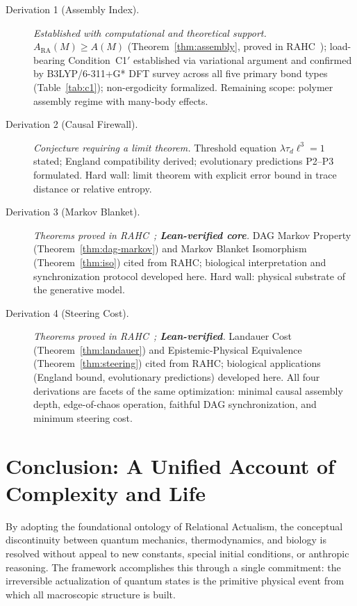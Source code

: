\documentclass[11pt,a4paper]{article}
\theoremstyle{plain}
\theoremstyle{definition}
\theoremstyle{remark}
\newcommand{\ARA}{A_{\mathrm{RA}}}
\begin{document}
\begin{description}
  \item[Derivation 1 (Assembly Index).] \textit{Established with computational
  and theoretical support.} $\ARA(M) \geq A(M)$ (Theorem~\ref{thm:assembly},
  proved in RAHC~\citep{Sandeman2026RAHC}); load-bearing Condition~C1$'$
  established via variational argument and confirmed by B3LYP/6-311+G* DFT survey
  across all five primary bond types (Table~\ref{tab:c1}); non-ergodicity
  formalized. Remaining scope: polymer assembly regime with many-body effects.

  \item[Derivation 2 (Causal Firewall).] \textit{Conjecture requiring a limit
  theorem.} Threshold equation $\lambda\tau_{d}\ell^{3} = 1$ stated; England
  compatibility derived; evolutionary predictions P2--P3 formulated. Hard wall:
  limit theorem with explicit error bound in trace distance or relative entropy.

  \item[Derivation 3 (Markov Blanket).] \textit{Theorems proved in
  RAHC~\citep{Sandeman2026RAHC}; \textbf{Lean-verified core}.}
  DAG Markov Property (Theorem~\ref{thm:dag-markov}) and Markov Blanket
  Isomorphism (Theorem~\ref{thm:iso}) cited from RAHC; biological interpretation
  and synchronization protocol developed here. Hard wall: physical substrate
  of the generative model.

  \item[Derivation 4 (Steering Cost).] \textit{Theorems proved in
  RAHC~\citep{Sandeman2026RAHC}; \textbf{Lean-verified}.}
  Landauer Cost (Theorem~\ref{thm:landauer}) and Epistemic-Physical Equivalence
  (Theorem~\ref{thm:steering}) cited from RAHC; biological applications
  (England bound, evolutionary predictions) developed here. All four derivations
  are facets of the same optimization: minimal causal assembly depth, edge-of-chaos
  operation, faithful DAG synchronization, and minimum steering cost.
\end{description}

\section{Conclusion: A Unified Account of Complexity and Life}

By adopting the foundational ontology of Relational Actualism, the conceptual
discontinuity between quantum mechanics, thermodynamics, and biology is resolved
without appeal to new constants, special initial conditions, or anthropic
reasoning. The framework accomplishes this through a single commitment: the
irreversible actualization of quantum states is the primitive physical event from
which all macroscopic structure is built.
\end{document}
